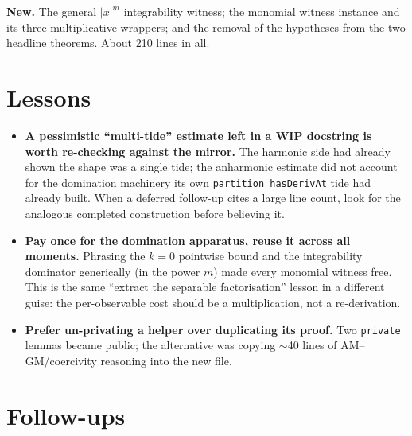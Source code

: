 \documentclass[11pt]{article}
\begin{document}
\textbf{New.} The general $|x|^m$ integrability witness; the monomial
witness instance and its three multiplicative wrappers; and the removal
of the hypotheses from the two headline theorems. About 210 lines in
all.

\section{Lessons}

\begin{itemize}[itemsep=3pt]
\item \textbf{A pessimistic ``multi-tide'' estimate left in a WIP
  docstring is worth re-checking against the mirror.} The harmonic side
  had already shown the shape was a single tide; the anharmonic estimate
  did not account for the domination machinery its own
  \texttt{partition\_hasDerivAt} tide had already built. When a deferred
  follow-up cites a large line count, look for the analogous completed
  construction before believing it.
\item \textbf{Pay once for the domination apparatus, reuse it across all
  moments.} Phrasing the $k{=}0$ pointwise bound and the integrability
  dominator generically (in the power $m$) made every monomial witness
  free. This is the same ``extract the separable factorisation''
  lesson in a different guise: the per-observable cost should be a
  multiplication, not a re-derivation.
\item \textbf{Prefer un-privating a helper over duplicating its proof.}
  Two \texttt{private} lemmas became public; the alternative was copying
  $\sim$40 lines of AM--GM/coercivity reasoning into the new file.
\end{itemize}

\section{Follow-ups}
\end{document}

